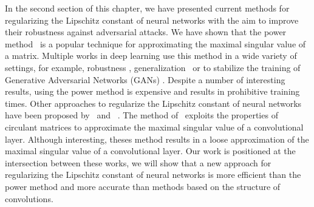 In the second section of this chapter, we have presented current methods for regularizing the Lipschitz constant of neural networks with the aim to improve their robustness against adversarial attacks.
We have shown that the power method~\cite{golub2000eigenvalue} is a popular technique for approximating the maximal singular value of a matrix.
Multiple works in deep learning use this method in a wide variety of settings, for example, robustness \cite{farnia2018generalizable,tsuzuku2018lipschitz}, generalization~\cite{yoshida2017spectral,gouk2018regularisation} or to stabilize the training of Generative Adversarial Networks (GANs) \cite{miyato2018spectral}.
Despite a number of interesting results, using the power method is expensive and results in prohibitive training times. 
Other approaches to regularize the Lipschitz constant of neural networks have been proposed by~\citet{sedghi2018singular} and ~\citet{singla2019bounding}.
The method of~\citet{sedghi2018singular,singla2019bounding} exploits the properties of circulant matrices to approximate the maximal singular value of a convolutional layer.
Although interesting, theses method results in a loose approximation of the maximal singular value of a convolutional layer.
Our work is positioned at the intersection between these works, we will show that a new approach for regularizing the Lipschitz constant of neural networks is more efficient than the power method and more accurate than methods based on the structure of convolutions.


